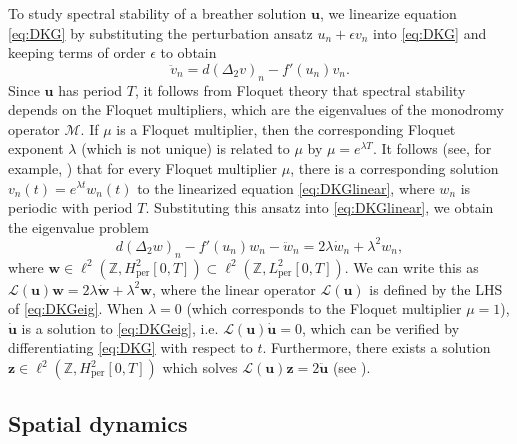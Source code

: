 \documentclass[12pt,reqno]{amsart}
\def\Z{{\mathbb Z}}
\def\per{\textrm{per}}
\def\calL{\mathcal{L}}
\newcommand{\uvec}{\mathbf{u}}
\newcommand{\wvec}{\mathbf{w}}
\newcommand{\zvec}{\mathbf{z}}
\begin{document}
To study spectral stability of a breather solution $\uvec$, we linearize equation \cref{eq:DKG} by substituting the perturbation ansatz $u_n + \epsilon v_n$ into \cref{eq:DKG} and keeping terms of order $\epsilon$ to obtain
\begin{equation}\label{eq:DKGlinear}
\ddot{v}_n = d (\Delta_2 v)_n - f'(u_n)v_n.
\end{equation}
Since $\uvec$ has period $T$, it follows from Floquet theory that spectral stability depends on the Floquet multipliers, which are the eigenvalues of the monodromy operator $\mathcal{M}$. If $\mu$ is a Floquet multiplier, then the corresponding Floquet exponent $\lambda$ (which is not unique) is related to $\mu$ by $\mu = e^{\lambda T}$. It follows (see, for example, \cite[Lemma 2.1.29]{Kapitula2013}) that for every Floquet multiplier $\mu$, there is a corresponding solution $v_n(t) = e^{\lambda t} w_n(t)$ to the linearized equation \cref{eq:DKGlinear}, where $w_n$ is periodic with period $T$. Substituting this ansatz into \cref{eq:DKGlinear}, we obtain the eigenvalue problem
\begin{equation}\label{eq:DKGeig}
d (\Delta_2 w)_n - f'(u_n)w_n - \ddot{w}_n = 2 \lambda \dot{w}_n + \lambda^2 w_n,
\end{equation}
where $\wvec \in \ell^2(\Z, H^2_\per[0,T]) \subset \ell^2(\Z, L^2_\per[0,T])$. We can write this as $\calL(\uvec)\wvec = 2 \lambda \dot{\wvec} + \lambda^2 \wvec$, where the linear operator $\calL(\uvec)$ is defined by the LHS of \cref{eq:DKGeig}. When $\lambda = 0$ (which corresponds to the Floquet multiplier $\mu = 1$), $\dot{\uvec}$ is a solution to \cref{eq:DKGeig}, i.e. $\calL(\uvec)\dot{\uvec}=0$, which can be verified by differentiating \cref{eq:DKG} with respect to $t$. Furthermore, there exists a solution $\zvec \in \ell^2(\Z, H^2_\per[0,T])$ which solves $\calL(\uvec)\zvec = 2 \ddot{\uvec}$ (see \cite[Section 3]{Pelinovsky2012}).

\subsection{Spatial dynamics}
\end{document}
